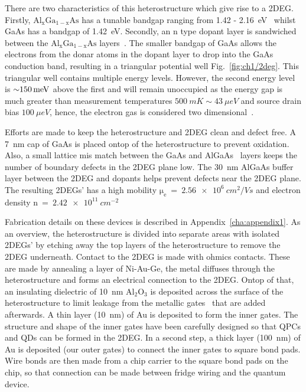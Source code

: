 There are two characteristics of this heterostructure which give rise to a 2DEG. Firstly, $\mathrm{Al_xGa_{1-x}As}$ has a tunable bandgap ranging from 1.42 - \qty{2.16}{eV}~\cite{gaas_overview} whilst GaAs has a bandgap of \qty{1.42}{eV}. Secondly, an n type dopant layer is sandwiched between the $\mathrm{Al_xGa_{1-x}As}$ layers~\cite{dopant_layer}. The smaller bandgap of GaAs allows the electrons from the donar atoms in the dopant layer to drop into the GaAs conduction band, resulting in a triangular potential well Fig.~\ref{fig:ch1/2deg}. This triangular well contains multiple energy levels. However, the second energy level is $\qty{\sim 150}{meV}$ above the first and will remain unoccupied as the energy gap is much greater than measurement temperatures $\qty{500}{mK}\sim\qty{43}{\mu eV}$ and source drain bias $\qty{100}{\mu eV}$, hence, the electron gas is considered two dimensional~\cite{BEENAKKER_1991}.

Efforts are made to keep the heterostructure and 2DEG clean and defect free. A \qty{7}{nm} cap of GaAs is placed ontop of the heterostructure to prevent oxidation. Also, a small lattice mis match between the GaAs and AlGaAs~\cite{gaas_superlattice} layers keeps the number of boundary defects in the 2DEG plane low. The \qty{30}{nm} AlGaAs buffer layer between the 2DEG and dopants helps prevent defects near the 2DEG plane. The resulting 2DEGs' has a high mobility $\mathrm{\mu_e}~=~\qty{2.56e6}{cm^2/Vs}$ and electron density $\mathrm{n}~=~\qty{2.42e11}{cm^{-2}}$

Fabrication details on these devices is described in Appendix~\ref{cha:appendix1}. As an overview, the heterostructure is divided into separate areas with isolated 2DEGs' by etching away the top layers of the heterostructure to remove the 2DEG underneath. Contact to the 2DEG is made with ohmics contacts. These are made by annealing a layer of Ni-Au-Ge, the metal diffuses through the heterostructure and forms an electrical connection to the 2DEG. Ontop of that, an insulating dielectric of \qty{10}{nm} $\mathrm{Al_2O_3}$ is deposited across the surface of the heterostructure to limit leakage from the metallic gates~\cite{insulating_gates} that are added afterwards. A thin layer (\qty{10}{nm}) of Au is deposited to form the inner gates. The structure and shape of the inner gates have been carefully designed so that QPCs and QDs can be formed in the 2DEG. In a second step, a thick layer (\qty{100}{nm}) of Au is deposited (our outer gates) to connect the inner gates to square bond pads. Wire bonds are then made from a chip carrier to the square bond pads on the chip, so that connection can be made between fridge wiring and the quantum device. 




